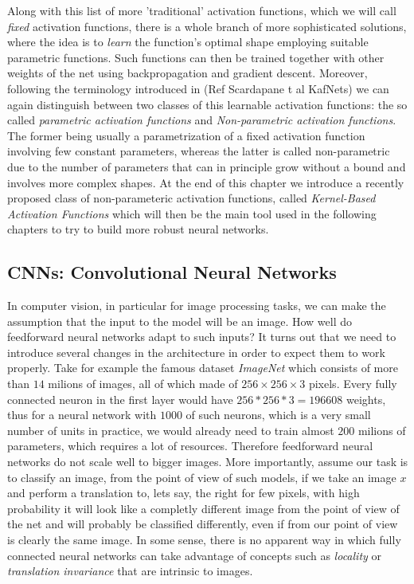 \documentclass[LaM,binding=0.6cm]{./packages/sapthesis/sapthesis}
\begin{document}
            Along with this list of more 'traditional' activation functions, which we will call \textit{fixed} activation functions, there is a whole branch of
            more sophisticated solutions, where the idea is to \textit{learn} the function's optimal shape employing suitable parametric functions. 
            Such functions can then be trained together with other weights of the net using backpropagation and gradient descent. Moreover, following the terminology
            introduced in (Ref Scardapane t al KafNets) we can again distinguish between two classes of this learnable activation functions: the so called
            \textit{parametric activation functions} and \textit{Non-parametric activation functions}. The former being usually a parametrization of a fixed 
            activation function involving few constant parameters, whereas the latter is called non-parametric due to the number of parameters that can in principle
            grow without a bound and involves more complex shapes. At the end of this chapter we introduce a recently proposed class of non-parameteric activation functions,
            called \textit{Kernel-Based Activation Functions} which will then be the main tool used in the following chapters to try to build more robust neural networks.    


        \subsection{CNNs: Convolutional Neural Networks}

            In computer vision, in particular for image processing tasks, we can make the assumption that the input to the model will be an image. 
            How well do feedforward neural networks adapt to such inputs? It turns out that we need to introduce several changes in the architecture in order to expect 
            them to work properly. Take for example the famous dataset \textit{ImageNet} which consists of more than $ 14 $ milions of images,
            all of which made of $ 256 \times 256 \times 3 $ pixels. Every fully connected neuron in the first layer would have $ 256 * 256 * 3 =  196608 $ weights,
            thus for a neural network with $ 1000 $ of such neurons, which is a very small number of units in practice, we would already need to train almost $ 200 $ milions of parameters,
            which requires a lot of resources. Therefore feedforward neural networks do not scale well to bigger images. More importantly, assume our task is to 
            classify an image, from the point of view of such models, if we take an image $x$ and perform a translation to, lets say, the right for few pixels, with high 
            probability it will look like a completly different image from the point of view of the net and will probably be classified differently, even if 
            from our point of view is clearly the same image. In some sense, there is no apparent way in which fully connected neural networks can take advantage of 
            concepts such as \textit{locality} or \textit{translation invariance} that are intrinsic to images.
            
\end{document}
